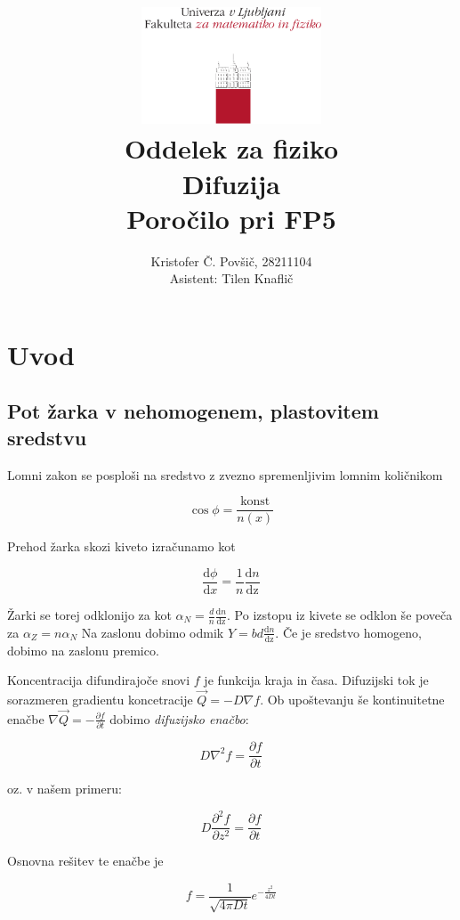 \documentclass[11pt]{article}
\title{
  \includegraphics[width=0.4\textwidth]{fmf_logo}\\
  {\small Oddelek za fiziko} \\
  {Difuzija}\\
  {\small Poročilo pri FP5}\\

}
\date{}
\author{ Kristofer Č. Povšič, 28211104 \\[5 cm]
 \small  Asistent: Tilen Knaflič \\
}
\begin{document}
\maketitle
\newpage
\tableofcontents

\section{Uvod}\label{sec:org7496756}
\subsection{Pot žarka v nehomogenem, plastovitem sredstvu}\label{sec:org81f2c64}
Lomni zakon se posploši na sredstvo z zvezno spremenljivim lomnim količnikom

\[ \cos \phi = \frac{\text{konst}}{n(x)}
\]

Prehod žarka skozi kiveto izračunamo kot

\begin{equation}
\label{eq:1}
\frac{\mathrm{d} \phi}{\mathrm{d} x} = \frac{1}{n} \frac{\mathrm{d} n}{\mathrm{dz} }
\end{equation}

Žarki se torej odklonijo za kot \(\alpha_N = \frac{d}{n} \frac{\mathrm{d} n}{\mathrm{dz}}\). Po izstopu iz kivete se odklon še poveča za \(\alpha_Z = n \alpha_N\) Na zaslonu dobimo odmik \(Y = bd \frac{\mathrm{d} n}{\mathrm{dz}}\). Če je sredstvo homogeno, dobimo na zaslonu premico.

Koncentracija difundirajoče snovi \(f\) je funkcija kraja in časa. Difuzijski tok je sorazmeren gradientu koncetracije \(\vec{Q} = - D \nabla f\). Ob upoštevanju še kontinuitetne enačbe \(\nabla \vec{Q} = -\frac{\partial f}{\partial t}\) dobimo \emph{difuzijsko enačbo}:

\begin{equation}
\label{eq:2}
D \nabla ^2 f = \frac{\partial f}{\partial t}
\end{equation}

oz. v našem primeru:

\begin{equation}
\label{eq:3}
D \frac{\partial ^2 f}{\partial z ^2} = \frac{\partial f}{\partial t}
\end{equation}

Osnovna rešitev te enačbe je

\begin{equation}
\label{eq:4}
f = \frac{1}{\sqrt{4 \pi Dt}} e^{- \frac{z ^2}{4Dt}}
\end{equation}
\end{document}
